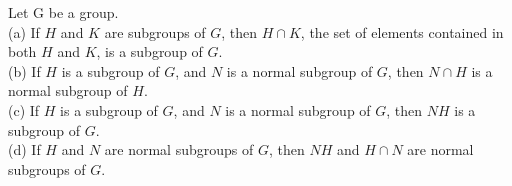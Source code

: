 \begin{theorem}
Let G be a group. \\
(a) If $H$ and $K$ are subgroups of $G$, then $H \cap K$, the set of elements contained in both $H$ and $K$, is a subgroup of $G$.\\
(b) If $H$ is a subgroup of $G$, and $N$ is a normal subgroup of $G$, then $N \cap H$ is a normal subgroup of $H$.\\
(c) If $H$ is a subgroup of $G$, and $N$ is a normal subgroup of $G$, then $NH$ is a subgroup of $G$.\\
(d) If $H$ and $N$ are normal subgroups of $G$, then $NH$ and $H \cap N$ are normal subgroups of $G$.
\end{theorem}


\endinput